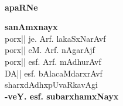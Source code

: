 
~
\medskip

\vfill

\thispagestyle{empty}

\begin{center}
{\Large\bfseries apaRNe}
\end{center}
\bigskip

\begin{center}
{\bf sanAmxnayx}\\[4pt]
porx|| je. Arf. lakaSxNarAvf\\[4pt]
porx|| eM. Arf. nAgarAjf\\[4pt]
porx|| esf. Arf. mAdhurAvf\\[4pt]
DA|| esf. bAlacaMdarxrAvf\\[0.6cm]
sharxdAdhxpUvaRkavAgi\\
\hfill{\bf -veY. esf. subarxhamxNayx}                                                   
\end{center}

\vfill
\eject
